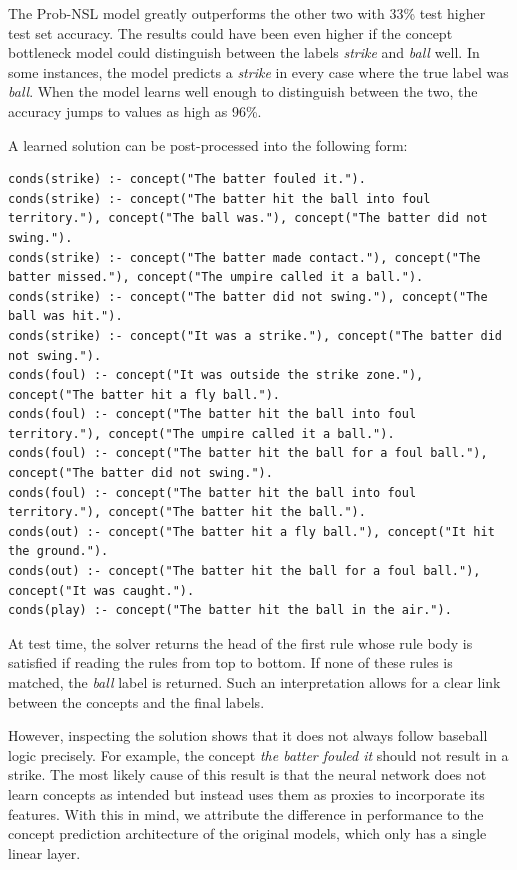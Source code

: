 The Prob-NSL model greatly outperforms the other two with 33\% test higher test set accuracy.
The results could have been even higher if the concept bottleneck model could distinguish between the labels \emph{strike} and \emph{ball} well.
In some instances, the model predicts a \emph{strike} in every case where the true label was \emph{ball}.
When the model learns well enough to distinguish between the two, the accuracy jumps to values as high as 96\%.

A learned solution can be post-processed into the following form:
\begin{lstlisting}
conds(strike) :- concept("The batter fouled it.").
conds(strike) :- concept("The batter hit the ball into foul territory."), concept("The ball was."), concept("The batter did not swing.").
conds(strike) :- concept("The batter made contact."), concept("The batter missed."), concept("The umpire called it a ball.").
conds(strike) :- concept("The batter did not swing."), concept("The ball was hit.").
conds(strike) :- concept("It was a strike."), concept("The batter did not swing.").
conds(foul) :- concept("It was outside the strike zone."), concept("The batter hit a fly ball.").
conds(foul) :- concept("The batter hit the ball into foul territory."), concept("The umpire called it a ball.").
conds(foul) :- concept("The batter hit the ball for a foul ball."), concept("The batter did not swing.").
conds(foul) :- concept("The batter hit the ball into foul territory."), concept("The batter hit the ball.").
conds(out) :- concept("The batter hit a fly ball."), concept("It hit the ground.").
conds(out) :- concept("The batter hit the ball for a foul ball."), concept("It was caught.").
conds(play) :- concept("The batter hit the ball in the air.").
\end{lstlisting}

At test time, the solver returns the head of the first rule whose rule body is satisfied if reading the rules from top to bottom.
If none of these rules is matched, the \emph{ball} label is returned.
Such an interpretation allows for a clear link between the concepts and the final labels.

However, inspecting the solution shows that it does not always follow baseball logic precisely. For example, the concept \emph{the batter fouled it} should not result in a strike.
The most likely cause of this result is that the neural network does not learn concepts as intended but instead uses them as proxies to incorporate its features.
With this in mind, we attribute the difference in performance to the concept prediction architecture of the original models, which only has a single linear layer.


